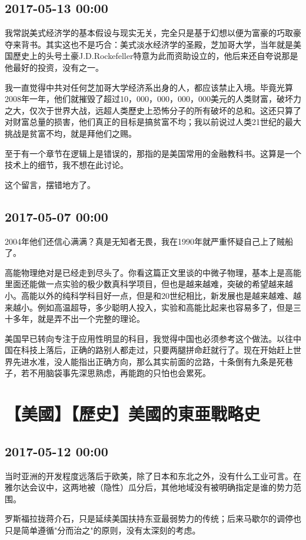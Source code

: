 \documentclass[twocolumn]{ctexart}
\begin{document}
\subsection*{2017-05-13 00:00}
我常説美式经济学的基本假设与现实无关，完全只是基于幻想以便为富豪的巧取豪夺来背书。其实这也不是巧合：美式淡水经济学的圣殿，芝加哥大学，当年就是美国歷史上的头号土豪J.D.Rockefeller特意为此而资助设立的，他后来还自夸说那是他最好的投资，没有之一。

我一直觉得中共对任何芝加哥大学经济系出身的人，都应该禁止入境。毕竟光算2008年一年，他们就摧毁了超过10，000，000，000，000美元的人类财富，破坏力之大，仅次于世界大战，远超人类歷史上恐怖分子的所有破坏的总和。这还只算了对财富总量的损害，他们真正的目标是搞贫富不均；我以前说过人类21世纪的最大挑战是贫富不均，就是拜他们之赐。

至于有一个章节在逻辑上是错误的，那指的是美国常用的金融教科书。这算是一个技术上的细节，我不想在此讨论。

这个留言，摆错地方了。\subsection*{2017-05-07 00:00}
2004年他们还信心满满？真是无知者无畏，我在1990年就严重怀疑自己上了贼船了。

高能物理绝对是已经走到尽头了。你看这篇正文里谈的中微子物理，基本上是高能里面还能做一点实验的极少数真科学项目，但也是越来越难，突破的希望越来越小。高能以外的纯科学科目好一点，但是和20世纪相比，新发展也是越来越难、越来越小。例如高温超导，多少聪明人投入，实验和高能比起来也容易多了，但是三十多年，就是弄不出一个完整的理论。

美国早已转向专注于应用性明显的科目，我觉得中国也必须参考这个做法。以往中国在科技上落后，正确的路别人都走过，只要两腿拼命赶就行了。现在开始赶上世界先进水准，没人能指出正确方向，那么其实前面的岔路，十条倒有九条是死巷子，若不用脑袋事先深思熟虑，再能跑的只怕也会累死。\section*{【美國】【歷史】美國的東亜戰略史}
\subsection*{2017-05-12 00:00}
当时亚洲的开发程度远落后于欧美，除了日本和东北之外，没有什么工业可言。在雅尔达会议中，这两地被（隐性）瓜分后，其他地域没有被明确指定是谁的势力范围。

罗斯福拉拢蒋介石，只是延续美国扶持东亚最弱势力的传统；后来马歇尔的调停也只是简单遵循"分而治之"的原则，没有太深刻的考虑。
\end{document}
